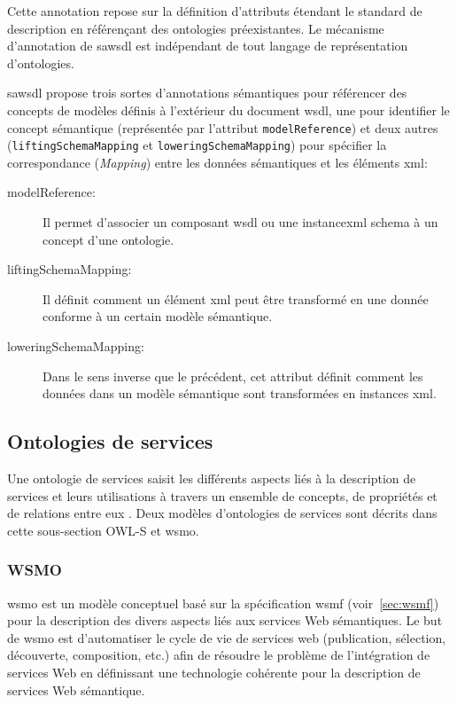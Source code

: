     Cette annotation repose sur la définition d'attributs étendant le
    standard de description en référençant des ontologies
    préexistantes. Le mécanisme d'annotation de \acrshort{sawsdl} est
    indépendant de tout langage de représentation
    \cite{lopez2008selection} d'ontologies.\medskip

    \acrshort{sawsdl} propose trois sortes d'annotations sémantiques
    pour référencer des concepts de modèles définis à l'extérieur du
    document \acrshort{wsdl}, une pour identifier le concept
    sémantique (représentée par l'attribut \texttt{modelReference}) et
    deux autres (\texttt{liftingSchemaMapping} et
    \texttt{loweringSchemaMapping}) pour spécifier la correspondance
    (\emph{Mapping}) entre les données sémantiques et les éléments
    \acrshort{xml}:\bigskip

    \renewcommand{\descriptionlabel}[1]{\hspace{0.5cm}\textbullet~\texttt{#1}}
    \begin{description}
    \item [modelReference:] Il permet d'associer un composant
      \acrshort{wsdl} ou une instance\acrshort{xml} schema à un concept
      d'une ontologie.

    \item [liftingSchemaMapping:] Il définit comment un élément
      \acrshort{xml} peut être transformé en une donnée conforme
      à un certain modèle sémantique.

    \item [loweringSchemaMapping:] Dans le sens inverse que le
      précédent, cet attribut définit comment les données dans un
      modèle sémantique sont transformées en instances \acrshort{xml}.
    \end{description}
    \enddescription

  \subsection{Ontologies de services}
  \label{sec:ontologies-services}
  Une ontologie de services saisit les différents aspects liés à la
  description de services et leurs utilisations à travers un ensemble
  de concepts, de propriétés et de relations entre eux
  \cite{elie2010}. Deux modèles d'ontologies de services sont décrits
  dans cette sous-section \textsc{OWL-S} et \acrshort{wsmo}.

    \subsubsection{WSMO}
    \label{sec:wsmo}
    \acrshort{wsmo} \cite{de2005web} est un modèle conceptuel basé sur
    la spécification \acrshort{wsmf} \cite{fensel2002web}
    (voir~\ref{sec:wsmf}) pour la description des divers aspects liés
    aux services Web sémantiques. Le but de \acrshort{wsmo} est
    d'automatiser le cycle de vie de services web (publication,
    sélection, découverte, composition, etc.) afin de résoudre le
    problème de l'intégration de services Web en définissant une
    technologie cohérente pour la description de services Web
    sémantique.\medskip

